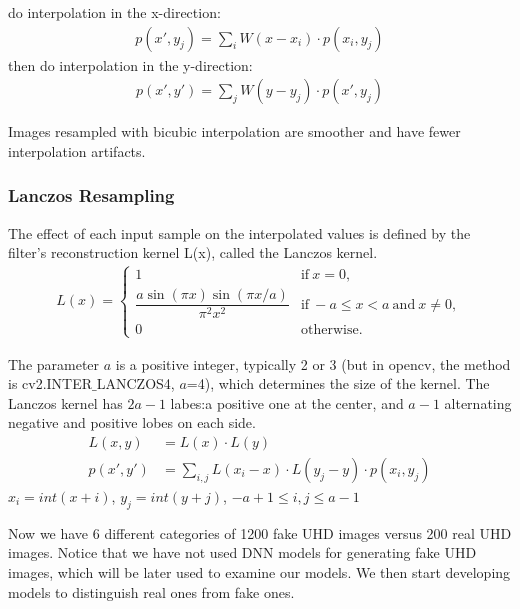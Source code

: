 \documentclass[journal,conference]{IEEEtran}
\begin{document}
do interpolation in the x-direction:
\begin{align*}
p(x',y_j)=\sum_{i}{W(x-x_i)\cdot p(x_i,y_j)}
\end{align*}
then do interpolation in the y-direction:
\begin{align*}
p(x',y')=\sum_{j}{W(y-y_j)\cdot p(x',y_j)} 
\end{align*}

Images resampled with bicubic interpolation are smoother and have fewer interpolation artifacts.

\subsubsection{Lanczos Resampling}
The effect of each input sample on the interpolated values is defined by the filter's reconstruction kernel L(x), called the Lanczos kernel. 
\begin{align*}
{\displaystyle L(x)={\begin{cases}1&{\text{if}}\ x=0,\\{\dfrac {a\sin(\pi x)\sin(\pi x/a)}{\pi ^{2}x^{2}}}&{\text{if}}\ -a\leq x<a\ {\text{and}}\ x\neq 0,\\0&{\text{otherwise}}.\end{cases}}}
\end{align*}
\par The parameter $a$ is a positive integer, typically 2 or 3 (but in opencv, the method is cv2.INTER$\_$LANCZOS4, $a$=4), which determines the size of the kernel. The Lanczos kernel has $2a-1$ labes:a positive one at the center, and $a-1$ alternating negative and positive lobes on each side.
\begin{align*}
L(x,y) &= L(x) \cdot L(y)\\
p(x',y') &= \sum_{i,j}{L(x_i-x)\cdot L(y_j-y)\cdot p(x_i,y_j)}
\end{align*}
$x_i=int(x+i)$, $y_j=int(y+j)$, $-a+1\leq i, j \leq a-1$

Now we have 6 different categories of 1200 fake UHD images versus 200 real UHD images.
Notice that we have not used DNN models for generating fake UHD images, which will be later used to examine our models.
We then start developing models to distinguish real ones from fake ones.
\end{document}
